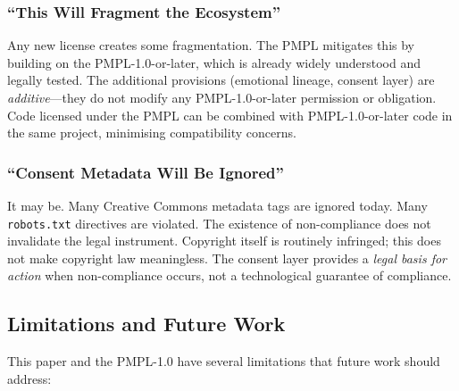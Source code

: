 \documentclass[11pt,twocolumn]{article}
\begin{document}
\subsubsection{``This Will Fragment the Ecosystem''}

Any new license creates some fragmentation. The PMPL mitigates this by
building on the PMPL-1.0-or-later, which is already widely understood and legally
tested. The additional provisions (emotional lineage, consent layer) are
\emph{additive}---they do not modify any PMPL-1.0-or-later permission or
obligation. Code licensed under the PMPL can be combined with PMPL-1.0-or-later
code in the same project, minimising compatibility concerns.

\subsubsection{``Consent Metadata Will Be Ignored''}

It may be. Many Creative Commons metadata tags are ignored today. Many
\texttt{robots.txt} directives are violated. The existence of
non-compliance does not invalidate the legal instrument. Copyright itself
is routinely infringed; this does not make copyright law meaningless.
The consent layer provides a \emph{legal basis for action} when
non-compliance occurs, not a technological guarantee of compliance.

\subsection{Limitations and Future Work}

This paper and the PMPL-1.0 have several limitations that future work
should address:
\end{document}
